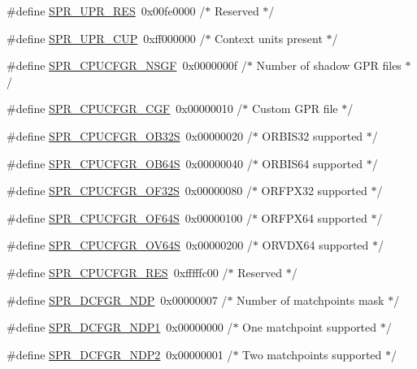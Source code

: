 \begin{DoxyCompactItemize}
\#define \hyperlink{spr-defs_8h_a7132d7d92af02836ffb0d734f068dfd3}{\-S\-P\-R\-\_\-\-U\-P\-R\-\_\-\-R\-E\-S}~0x00fe0000  /$\ast$ Reserved $\ast$/
\item 
\#define \hyperlink{spr-defs_8h_a3ce0288cc893db61faccaba3924c67cb}{\-S\-P\-R\-\_\-\-U\-P\-R\-\_\-\-C\-U\-P}~0xff000000  /$\ast$ Context units present $\ast$/
\item 
\#define \hyperlink{spr-defs_8h_aa4f52be9ed1c9b444d6df4857083425f}{\-S\-P\-R\-\_\-\-C\-P\-U\-C\-F\-G\-R\-\_\-\-N\-S\-G\-F}~0x0000000f  /$\ast$ Number of shadow G\-P\-R files $\ast$/
\item 
\#define \hyperlink{spr-defs_8h_a99b419e8be4eaaca30716ce08d38e2df}{\-S\-P\-R\-\_\-\-C\-P\-U\-C\-F\-G\-R\-\_\-\-C\-G\-F}~0x00000010  /$\ast$ Custom G\-P\-R file $\ast$/
\item 
\#define \hyperlink{spr-defs_8h_a81dd975cc7c09975ac066ef6cc197ec2}{\-S\-P\-R\-\_\-\-C\-P\-U\-C\-F\-G\-R\-\_\-\-O\-B32\-S}~0x00000020  /$\ast$ O\-R\-B\-I\-S32 supported $\ast$/
\item 
\#define \hyperlink{spr-defs_8h_aea0525fe35f8a96b4154d15ea28c88c2}{\-S\-P\-R\-\_\-\-C\-P\-U\-C\-F\-G\-R\-\_\-\-O\-B64\-S}~0x00000040  /$\ast$ O\-R\-B\-I\-S64 supported $\ast$/
\item 
\#define \hyperlink{spr-defs_8h_ac1a7b0ee7da5f80c5451bfe9b9edd31b}{\-S\-P\-R\-\_\-\-C\-P\-U\-C\-F\-G\-R\-\_\-\-O\-F32\-S}~0x00000080  /$\ast$ O\-R\-F\-P\-X32 supported $\ast$/
\item 
\#define \hyperlink{spr-defs_8h_a7bac845b810607bb044433f8d215f77d}{\-S\-P\-R\-\_\-\-C\-P\-U\-C\-F\-G\-R\-\_\-\-O\-F64\-S}~0x00000100  /$\ast$ O\-R\-F\-P\-X64 supported $\ast$/
\item 
\#define \hyperlink{spr-defs_8h_ab5f15927d1d3064aa0e36814b7aeef38}{\-S\-P\-R\-\_\-\-C\-P\-U\-C\-F\-G\-R\-\_\-\-O\-V64\-S}~0x00000200  /$\ast$ O\-R\-V\-D\-X64 supported $\ast$/
\item 
\#define \hyperlink{spr-defs_8h_afed33fc58708068a7a8d043f2f7adf67}{\-S\-P\-R\-\_\-\-C\-P\-U\-C\-F\-G\-R\-\_\-\-R\-E\-S}~0xfffffc00  /$\ast$ Reserved $\ast$/
\item 
\#define \hyperlink{spr-defs_8h_a8793e71f452c188a667e405f074f6ee7}{\-S\-P\-R\-\_\-\-D\-C\-F\-G\-R\-\_\-\-N\-D\-P}~0x00000007  /$\ast$ Number of matchpoints mask $\ast$/
\item 
\#define \hyperlink{spr-defs_8h_a46a102bf5d9e22717ed11187aa4a0c0d}{\-S\-P\-R\-\_\-\-D\-C\-F\-G\-R\-\_\-\-N\-D\-P1}~0x00000000  /$\ast$ One matchpoint supported $\ast$/
\item 
\#define \hyperlink{spr-defs_8h_a6dd21c96501dae520e93237ec1ac09e9}{\-S\-P\-R\-\_\-\-D\-C\-F\-G\-R\-\_\-\-N\-D\-P2}~0x00000001  /$\ast$ Two matchpoints supported $\ast$/

\end{DoxyCompactItemize}
